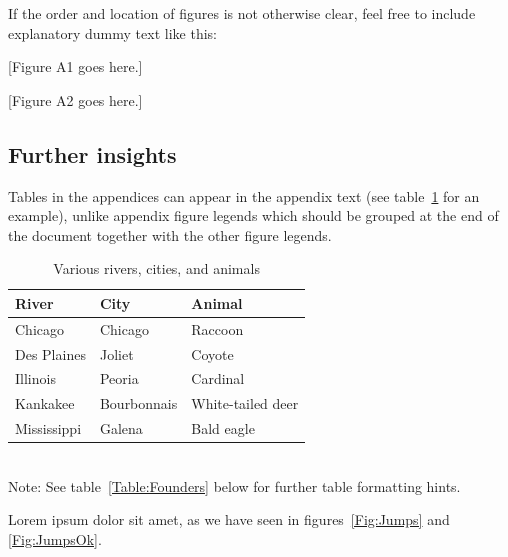 \documentclass[11pt]{article}\usepackage[sc]{mathpazo} %
\begin{document}
If the order and location of figures is not otherwise clear, feel free to include explanatory dummy text like this:

[Figure A1 goes here.]

[Figure A2 goes here.]

\subsection*{Further insights}

Tables in the appendices can appear in the appendix text (see table~\ref{Table:Rivers} for an example), unlike appendix figure legends which should be grouped at the end of the document together with the other figure legends.

\begin{table}[h]
\caption{Various rivers, cities, and animals}
\label{Table:Rivers}
\centering
\begin{tabular}{lll}\hline
River        & City        & Animal            \\ \hline
Chicago      & Chicago     & Raccoon           \\
Des Plaines  & Joliet      & Coyote            \\
Illinois     & Peoria      & Cardinal          \\
Kankakee     & Bourbonnais & White-tailed deer \\
Mississippi  & Galena      & Bald eagle        \\ \hline
\end{tabular}
\bigskip{}
\\
{\footnotesize Note: See table~\ref{Table:Founders} below for further table formatting hints.}
\end{table}

Lorem ipsum dolor sit amet, as we have seen in figures~\ref{Fig:Jumps} and \ref{Fig:JumpsOk}.


%
%
\end{document}
